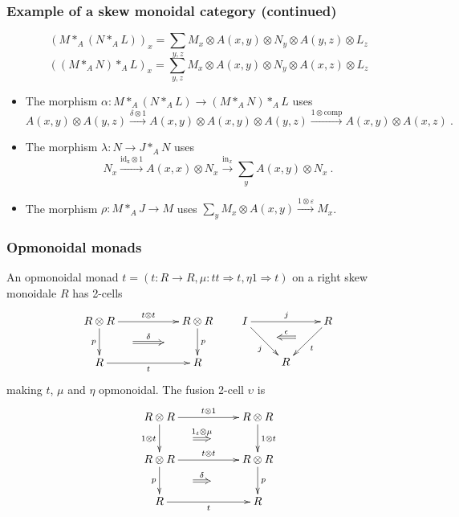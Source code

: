 \documentclass{beamer}
\newcommand{\lra}{\longrightarrow}
\begin{document}
\begin{frame}
  \frametitle{Example of a skew monoidal category (continued)}
   
$$(M\ast_A (N\ast_A L))_x = \sum_{y,z} {M_x \otimes A(x,y) \otimes N_y \otimes A(y,z)\otimes L_z}$$
$$((M\ast_A N)\ast_A L)_x = \sum_{y,z} {M_x \otimes A(x,y) \otimes N_y \otimes A(x,z)\otimes L_z} $$
 \begin{itemize}
\item<1->The morphism $\alpha : M\ast_A (N\ast_A L) \lra (M\ast_A N)\ast_A L$ uses
$$A(x,y)\otimes A(y,z) \stackrel{\delta \otimes 1}\lra A(x,y)\otimes A(x,y)\otimes A(y,z) \stackrel{1\otimes \mathrm{comp}}\lra A(x,y)\otimes A(x,z) \ .$$ 
\item<2-> 
The morphism $\lambda : N \lra J\ast_A N$ uses
$$N_x \stackrel{\mathrm{id_x}\otimes 1}\lra A(x,x)\otimes N_x \stackrel{\mathrm{in}_x}\lra \sum_y{A(x,y)\otimes N_x} \ .$$ 
\item<3-> 
The morphism $\rho : M\ast_A J\lra M$ uses $\sum_y{M_x\otimes A(x,y) \stackrel{1\otimes \varepsilon}\lra M_x}$. 
 \end{itemize}
\end{frame}

\begin{frame}
  \frametitle{Opmonoidal monads}
  An opmonoidal monad $t = (t : R\rightarrow R,\mu :tt \Rightarrow t ,\eta 1\Rightarrow t)$ 
on a right skew monoidale $R$ has 2-cells 
\begin{equation*}
\begin{aligned}
\xymatrix{
R\otimes R \ar[d]_{p}^(0.5){\phantom{AAAA}}="1" \ar[rr]^{t\otimes t}  && R\otimes R \ar[d]^{p}_(0.5){\phantom{AAAA}}="2" \ar@{=>}"1";"2"^-{\delta}
\\
R \ar[rr]_-{t} && R 
}
\qquad
\xymatrix{
I \ar[rd]_{j}^(0.5){\phantom{a}}="1" \ar[rr]^{j}  && R \ar[ld]^{t}_(0.5){\phantom{a}}="2" \ar@{<=}"1";"2"^-{\epsilon}
\\
& R 
}
\end{aligned}
\end{equation*}
making $t $, $\mu$ and $\eta$ opmonoidal.
The fusion 2-cell $\upsilon$ is 
\begin{eqnarray}\label{opmonmndfus}
\xymatrix{
R\otimes R \ar[d]_{1\otimes t}^(0.5){\phantom{AAAA}}="1" \ar[rr]^{t\otimes 1}
&& R\otimes R \ar[d]^{1\otimes t}_(0.5){\phantom{AAAAAA}}="2" \ar@{=>}"1";"2"^-{1_t \otimes \mu} \\
R\otimes R \ar[d]_{p}^(0.5){\phantom{AAAA}}="1" \ar[rr]^{t\otimes t}
&& R\otimes R \ar[d]^{p}_(0.5){\phantom{AAAAAA}}="2" \ar@{=>}"1";"2"^-{\delta} \\
R \ar[rr]_t && R }
\end{eqnarray}
\end{frame}
\end{document}
